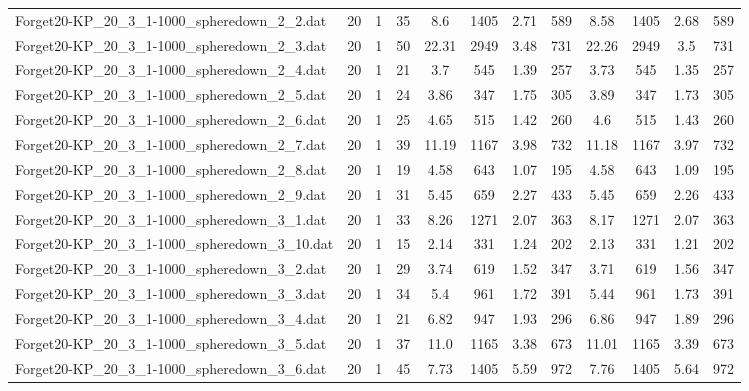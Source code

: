 \begin{sidewaystable}[!ht]
{\begin{tabular}{lccccccccccc}
Forget20-KP\_20\_3\_1-1000\_spheredown\_2\_2.dat & 20 & 1 & 35 & 8.6 & 1405 & 2.71 & 589 & 8.58 & 1405 &  \textcolor{blue2}{2.68} & 589 \\
Forget20-KP\_20\_3\_1-1000\_spheredown\_2\_3.dat & 20 & 1 & 50 & 22.31 & 2949 &  \textcolor{blue2}{3.48} & 731 & 22.26 & 2949 & 3.5 & 731 \\
Forget20-KP\_20\_3\_1-1000\_spheredown\_2\_4.dat & 20 & 1 & 21 & 3.7 & 545 & 1.39 & 257 & 3.73 & 545 & 1.35 & 257 \\
Forget20-KP\_20\_3\_1-1000\_spheredown\_2\_5.dat & 20 & 1 & 24 & 3.86 & 347 & 1.75 & 305 & 3.89 & 347 &  \textcolor{blue2}{1.73} & 305 \\
Forget20-KP\_20\_3\_1-1000\_spheredown\_2\_6.dat & 20 & 1 & 25 & 4.65 & 515 & 1.42 & 260 & 4.6 & 515 & 1.43 & 260 \\
Forget20-KP\_20\_3\_1-1000\_spheredown\_2\_7.dat & 20 & 1 & 39 & 11.19 & 1167 & 3.98 & 732 & 11.18 & 1167 &  \textcolor{blue2}{3.97} & 732 \\
Forget20-KP\_20\_3\_1-1000\_spheredown\_2\_8.dat & 20 & 1 & 19 & 4.58 & 643 &  \textcolor{blue2}{1.07} & 195 & 4.58 & 643 & 1.09 & 195 \\
Forget20-KP\_20\_3\_1-1000\_spheredown\_2\_9.dat & 20 & 1 & 31 & 5.45 & 659 & 2.27 & 433 & 5.45 & 659 & 2.26 & 433 \\
Forget20-KP\_20\_3\_1-1000\_spheredown\_3\_1.dat & 20 & 1 & 33 & 8.26 & 1271 &  \textcolor{blue2}{2.07} & 363 & 8.17 & 1271 &  \textcolor{blue2}{2.07} & 363 \\
Forget20-KP\_20\_3\_1-1000\_spheredown\_3\_10.dat & 20 & 1 & 15 & 2.14 & 331 & 1.24 & 202 & 2.13 & 331 &  \textcolor{blue2}{1.21} & 202 \\
Forget20-KP\_20\_3\_1-1000\_spheredown\_3\_2.dat & 20 & 1 & 29 & 3.74 & 619 &  \textcolor{blue2}{1.52} & 347 & 3.71 & 619 & 1.56 & 347 \\
Forget20-KP\_20\_3\_1-1000\_spheredown\_3\_3.dat & 20 & 1 & 34 & 5.4 & 961 &  \textcolor{blue2}{1.72} & 391 & 5.44 & 961 & 1.73 & 391 \\
Forget20-KP\_20\_3\_1-1000\_spheredown\_3\_4.dat & 20 & 1 & 21 & 6.82 & 947 & 1.93 & 296 & 6.86 & 947 &  \textcolor{blue2}{1.89} & 296 \\
Forget20-KP\_20\_3\_1-1000\_spheredown\_3\_5.dat & 20 & 1 & 37 & 11.0 & 1165 &  \textcolor{blue2}{3.38} & 673 & 11.01 & 1165 & 3.39 & 673 \\
Forget20-KP\_20\_3\_1-1000\_spheredown\_3\_6.dat & 20 & 1 & 45 & 7.73 & 1405 &  \textcolor{blue2}{5.59} & 972 & 7.76 & 1405 & 5.64 & 972 \\

\end{tabular}}
\end{sidewaystable}
